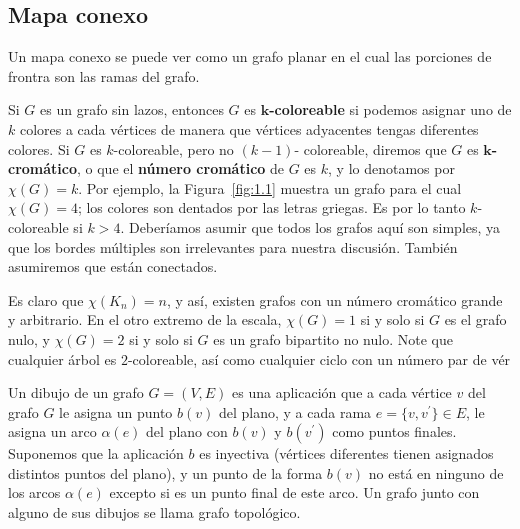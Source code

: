 \documentclass[
	3p,
	times,
	a4paper,
	authoryear
]{elsarticle}%
\begin{document}
\subsection{Mapa conexo}\label{sec:2.1}
Un mapa conexo se puede ver como un grafo planar en el cual las porciones de frontra son las ramas del grafo.


Si $G$ es un grafo sin lazos, entonces $G$ es \textbf{$\bm{k}$-coloreable} si podemos asignar uno de $k$ colores a cada vértices de manera que vértices adyacentes tengas diferentes colores. Si $G$ es $k$-coloreable, pero no $(k-1)$- coloreable, diremos que $G$ es \textbf{$\bm{k}$-cromático}, o que el \textbf{número cromático} de $G$ es $k$, y lo denotamos por $\chi(G)=k$. Por ejemplo, la Figura~\ref{fig:1.1} muestra un grafo para el cual $\chi(G)=4$; los colores son dentados por las letras griegas. Es por lo tanto $k$-coloreable si $k>4$. Deberíamos asumir que todos los grafos aquí son simples, ya que los bordes múltiples son irrelevantes para nuestra discusión. También asumiremos que están conectados.

Es claro que $\chi(K_n)=n$, y así, existen grafos con un número cromático grande y arbitrario. En el otro extremo de la escala, $\chi(G)=1$ si y solo si $G$ es el grafo nulo, y $\chi(G)=2$ si y solo si $G$ es un grafo bipartito no nulo. Note que cualquier árbol es $2$-coloreable, así como cualquier ciclo con un número par de vér


\begin{definition}

Un dibujo de un grafo $G=(V,E)$ es una aplicación que a cada vértice $v$ del grafo $G$ le asigna un punto $b(v)$ del plano, y a cada rama $e=\{v,v^{\prime}\}\in E$, le asigna un arco $\alpha(e)$ del plano con $b(v)$ y $b(v^{\prime})$ como puntos finales. Suponemos que la aplicación $b$ es inyectiva (vértices diferentes tienen asignados distintos puntos del plano), y un punto de la forma $b(v)$ no está en ninguno de los arcos $\alpha(e)$ excepto si es un punto final de este arco. Un grafo junto con alguno de sus dibujos se llama grafo topológico.

\end{definition}
\end{document}
